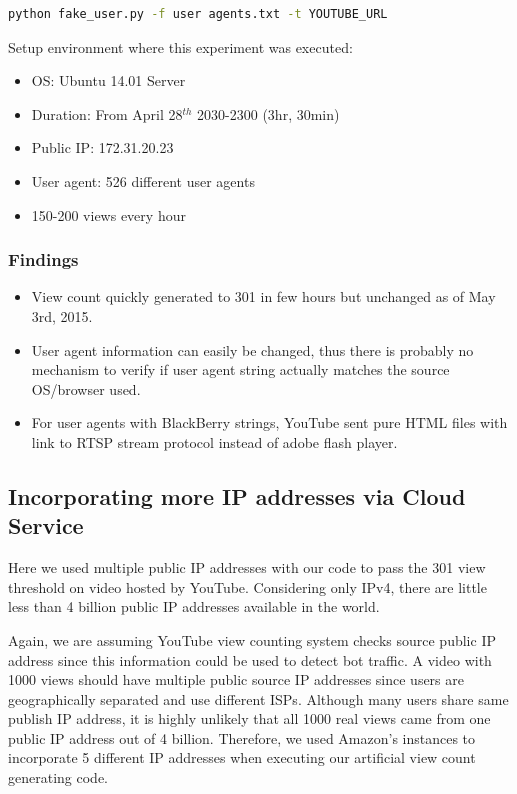 \documentclass[conference]{IEEEtran}
\begin{document}
\begin{lstlisting}[frame=single, language=bash]
python fake_user.py -f user agents.txt -t YOUTUBE_URL
\end{lstlisting}

Setup environment where this experiment was executed:
\begin{itemize}
  \setlength\itemsep{-0.1em}
  \item OS: Ubuntu 14.01 Server
  \item Duration: From April 28$^{th}$ 2030-2300 (3hr, 30min)
  \item Public IP: 172.31.20.23
  \item User agent: 526 different user agents
  \item 150-200 views every hour
\end{itemize}

\subsubsection*{Findings}
\begin{itemize}
  \setlength\itemsep{-0.1em}
  \item View count quickly generated to 301 in few hours but unchanged as of May 3rd, 2015.
  \item User agent information can easily be changed, thus there is probably no mechanism to verify if user agent string actually matches the source OS/browser used.
  \item For user agents with BlackBerry strings, YouTube sent pure HTML files with link to RTSP stream protocol instead of adobe flash player.
\end{itemize}


\subsection{Incorporating more IP addresses via Cloud Service}

Here we used multiple public IP addresses with our code to pass the 301 view threshold on video hosted by YouTube. Considering only IPv4, there are little less than 4 billion public IP addresses available in the world.

Again, we are assuming YouTube view counting system checks source public IP address since this information could be used to detect bot traffic. A video with 1000 views should have multiple public source IP addresses since users are geographically separated and use different ISPs. Although many users share same publish IP address, it is highly unlikely that all 1000 real views came from one public IP address out of 4 billion. Therefore, we used Amazon’s instances to incorporate 5 different IP addresses when executing our artificial view count generating code.
\end{document}
